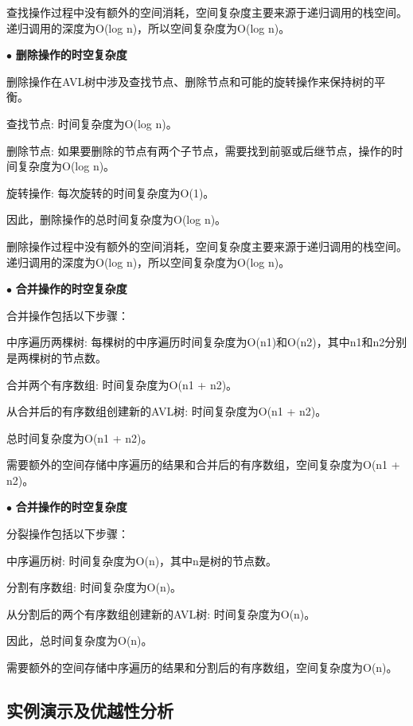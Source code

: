 查找操作过程中没有额外的空间消耗，空间复杂度主要来源于递归调用的栈空间。递归调用的深度为O(log n)，所以空间复杂度为O(log n)。

\vspace{1ex}

\noindent
$\bullet$
\textbf{删除操作的时空复杂度}

删除操作在AVL树中涉及查找节点、删除节点和可能的旋转操作来保持树的平衡。

查找节点: 时间复杂度为O(log n)。

删除节点: 如果要删除的节点有两个子节点，需要找到前驱或后继节点，操作的时间复杂度为O(log n)。

旋转操作: 每次旋转的时间复杂度为O(1)。

因此，删除操作的总时间复杂度为O(log n)。

删除操作过程中没有额外的空间消耗，空间复杂度主要来源于递归调用的栈空间。递归调用的深度为O(log n)，所以空间复杂度为O(log n)。

\vspace{1ex}

\noindent
$\bullet$
\textbf{合并操作的时空复杂度}

合并操作包括以下步骤：

中序遍历两棵树: 每棵树的中序遍历时间复杂度为O(n1)和O(n2)，其中n1和n2分别是两棵树的节点数。

合并两个有序数组: 时间复杂度为O(n1 + n2)。

从合并后的有序数组创建新的AVL树: 时间复杂度为O(n1 + n2)。

总时间复杂度为O(n1 + n2)。

需要额外的空间存储中序遍历的结果和合并后的有序数组，空间复杂度为O(n1 + n2)。

\vspace{1ex}

\noindent
$\bullet$
\textbf{合并操作的时空复杂度}

分裂操作包括以下步骤：

中序遍历树: 时间复杂度为O(n)，其中n是树的节点数。

分割有序数组: 时间复杂度为O(n)。

从分割后的两个有序数组创建新的AVL树: 时间复杂度为O(n)。

因此，总时间复杂度为O(n)。

需要额外的空间存储中序遍历的结果和分割后的有序数组，空间复杂度为O(n)。

\subsection{实例演示及优越性分析}

